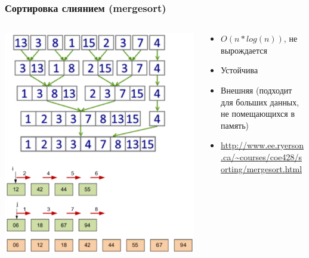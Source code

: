 \documentclass[xetex,mathserif,serif]{beamer}
\begin{document}
	\begin{frame}
		\frametitle{Сортировка слиянием (mergesort)}
		\begin{columns}
			\begin{column}{0.45\textwidth}
				\includegraphics[width=\textwidth]{mergesort.png}
			\end{column}
			\begin{column}{0.55\textwidth}
				\begin{itemize}
					\item $O(n * log(n))$, не вырождается
					\item Устойчива
					\item Внешняя (подходит для больших данных, не помещающихся в память)
					\item \url{http://www.ee.ryerson.ca/~courses/coe428/sorting/mergesort.html}
				\end{itemize}
			\end{column}
		\end{columns}
	\end{frame}
\end{document}
